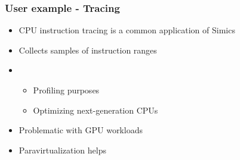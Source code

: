 \begin{frame}
  \frametitle{User example - Tracing}

  \begin{itemize}
  \item CPU instruction tracing is a common application of Simics
  \item Collects samples of instruction ranges
  \item \begin{itemize}\item{Profiling purposes}\item{Optimizing next-generation CPUs}\end{itemize}
  \item Problematic with GPU workloads
  \item Paravirtualization helps
  \end{itemize}

\end{frame}
